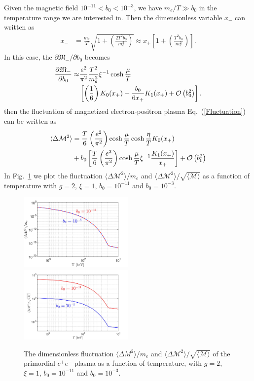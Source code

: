 \documentclass[aps,prd,floatfix,reprint]{revtex4-2}
\begin{document}
{ Given the magnetic field $10^{-11}<b_0<10^{-3}$, we have $m_e/T\gg b_0$ in the temperature range we are interested in. Then the dimensionless variable $x_{-}$ can written as
 \begin{align}
 x_{-}&=\frac{m_e}{T}\sqrt{1+\left(\frac{2T^2b_0}{m^2_e}\right)}\approx x_{+}\left[1+\left(\frac{T^2b_0}{m^2_e}\right)\right].
 \end{align}
In this case, the $\partial{\mathfrak M}_{-}/\partial b_0$ becomes
\begin{align}
\frac{\partial {\mathfrak M}_{-} }{\partial b_0}\approx&\frac{e^{2}}{\pi^{2}}\frac{T^{2}}{m_{e}^{2}}\xi^{-1}\cosh{\frac{\mu}{T}}\notag\\
&\left[\left(\frac{1}{6}\right)K_0(x_{+})+\frac{b_0}{6x_{+}}K_1(x_{+})+{\cal O}\left(b_{0}^{2}\right)\right].
\end{align}
then the fluctuation of magnetized electron-positron plasma Eq.~(\ref{Fluctuation}) can be written as
 \begin{align}
  \langle\Delta \mathcal{M}^2\rangle
  &=\frac{T}{6}\left(\frac{e^{2}}{\pi^{2}}\right)\cosh{\frac{\mu}{T}}\cosh{\frac{\eta}{T}} K_0(x_+)\notag\\
  &+b_0\left[\frac{T}{6}\left(\frac{e^{2}}{\pi^{2}}\right)\cosh{\frac{\mu}{T}}\xi^{-1}\frac{K_1(x_+)}{x_+}\right]+{\cal O}\left(b_{0}^{2}\right)
 \end{align} 
 In Fig.~\ref{Flu_fig} we plot the fluctuation $ \langle\Delta {\mathcal M}^2\rangle/m_e$ and  $\langle\Delta {\mathcal M}^2\rangle/\sqrt{\langle \mathcal M\rangle}$ as a function of temperature with $g=2$,  $\xi=1$, $b_0=10^{-11}$ and $b_0=10^{-3}$.
\begin{figure}[ht]
 \centering
 \includegraphics[width=0.5\textwidth]{plots/Fluctuation_Magnetization}
 \includegraphics[width=0.5\textwidth]{plots/Fluctuation_M002}
 \caption{The  dimensionless fluctuation $ \langle\Delta {M}^2\rangle/m_e$  and  $\langle\Delta {\mathcal M}^2\rangle/\sqrt{\langle \mathcal M\rangle}$ of the primordial $e^{+}e^{-}$-plasma as a function of temperature, with $g=2$,  $\xi=1$, $b_0=10^{-11}$ and $b_0=10^{-3}$.} 
 \label{Flu_fig} 
\end{figure}

}
\end{document}
